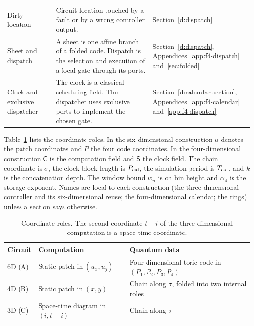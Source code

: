 \begin{table}[!tb]
\begin{tabular}{@{}>{\raggedright\arraybackslash}p{.23\linewidth}>{\raggedright\arraybackslash}p{.51\linewidth}>{\raggedright\arraybackslash}p{.19\linewidth}@{}}
Dirty location & Circuit location touched by a fault or by a wrong controller output. & Section~\ref{d:dispatch}\\\addlinespace[3pt]
Sheet and dispatch & A sheet is one affine branch of a folded code. Dispatch is the selection and execution of a local gate through its ports. & Section~\ref{d:dispatch}, Appendices~\ref{app:f4-dispatch} and~\ref{sec:folded}\\\addlinespace[3pt]
Clock and exclusive dispatcher & The clock is a classical scheduling field. The dispatcher uses exclusive ports to implement the chosen gate. & Section~\ref{d:calendar-section}, Appendices~\ref{app:f4-calendar} and~\ref{app:f4-dispatch}\\
\bottomrule
\end{tabular}
\end{table}
Table~\ref{tab:geometry} lists the coordinate roles. In the six-dimensional construction \(u\) denotes the patch coordinates and \(P\) the four code coordinates. In the four-dimensional construction \(\mathsf C\) is the computation field and \(\mathsf S\) the clock field. The chain coordinate is \(\sigma\), the clock block length is \(P_{\rm cal}\), the simulation period is \(T_{\rm cal}\), and \(k\) is the concatenation depth. The window bound \(w_n\) is on bin height and \(\alpha_4\) is the storage exponent. Names are local to each construction (the three-dimensional controller and its six-dimensional reuse; the four-dimensional calendar; the rings) unless a section says otherwise.

\begin{table}[!tb]
\caption{Coordinate roles. The second coordinate \(t-i\) of the three-dimensional computation is a space-time coordinate.}\label{tab:geometry}
\centering\small
\begin{tabular}{@{}l>{\raggedright\arraybackslash}p{.32\linewidth}>{\raggedright\arraybackslash}p{.49\linewidth}@{}}
\toprule Circuit & Computation & Quantum data\\\midrule
6D (A) & Static patch in \((u_x,u_y)\) & Four-dimensional toric code in \((P_1,P_2,P_3,P_4)\)\\\addlinespace[3pt]
4D (B) & Static patch in \((x,y)\) & Chain along \(\sigma\), folded into two internal roles\\\addlinespace[3pt]
3D (C) & Space-time diagram in \((i,t-i)\) & Chain along \(\sigma\)\\\bottomrule
\end{tabular}
\end{table}

